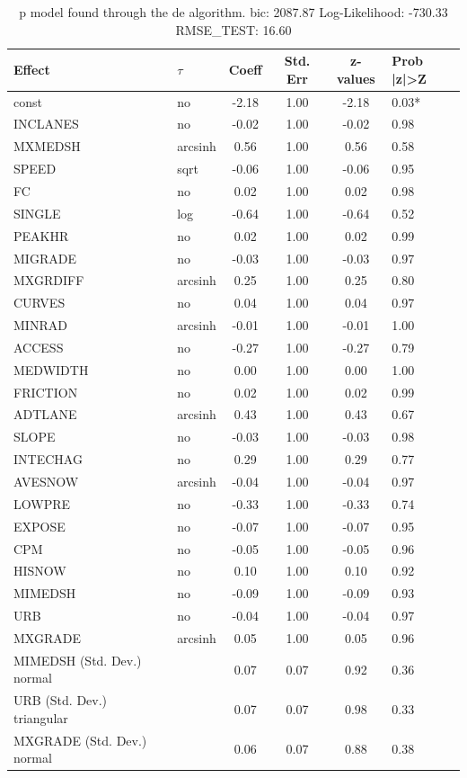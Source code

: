 \begin{table}
	\caption{p model found through the de algorithm. bic: 2087.87 Log-Likelihood: -730.33 RMSE_TEST: 16.60}
	\begin{center}
		\begin{tabular}{|l|l|c|c|c|l|}
			\hline
			Effect & $\tau$ & Coeff & Std. Err & z-values & Prob |z|>Z \\
			\hline
			const & no & -2.18 & 1.00 & -2.18 & 0.03* \\
			\hline
			INCLANES & no & -0.02 & 1.00 & -0.02 & 0.98 \\
			\hline
			MXMEDSH & arcsinh & 0.56 & 1.00 & 0.56 & 0.58 \\
			\hline
			SPEED & sqrt & -0.06 & 1.00 & -0.06 & 0.95 \\
			\hline
			FC & no & 0.02 & 1.00 & 0.02 & 0.98 \\
			\hline
			SINGLE & log & -0.64 & 1.00 & -0.64 & 0.52 \\
			\hline
			PEAKHR & no & 0.02 & 1.00 & 0.02 & 0.99 \\
			\hline
			MIGRADE & no & -0.03 & 1.00 & -0.03 & 0.97 \\
			\hline
			MXGRDIFF & arcsinh & 0.25 & 1.00 & 0.25 & 0.80 \\
			\hline
			CURVES & no & 0.04 & 1.00 & 0.04 & 0.97 \\
			\hline
			MINRAD & arcsinh & -0.01 & 1.00 & -0.01 & 1.00 \\
			\hline
			ACCESS & no & -0.27 & 1.00 & -0.27 & 0.79 \\
			\hline
			MEDWIDTH & no & 0.00 & 1.00 & 0.00 & 1.00 \\
			\hline
			FRICTION & no & 0.02 & 1.00 & 0.02 & 0.99 \\
			\hline
			ADTLANE & arcsinh & 0.43 & 1.00 & 0.43 & 0.67 \\
			\hline
			SLOPE & no & -0.03 & 1.00 & -0.03 & 0.98 \\
			\hline
			INTECHAG & no & 0.29 & 1.00 & 0.29 & 0.77 \\
			\hline
			AVESNOW & arcsinh & -0.04 & 1.00 & -0.04 & 0.97 \\
			\hline
			LOWPRE & no & -0.33 & 1.00 & -0.33 & 0.74 \\
			\hline
			EXPOSE & no & -0.07 & 1.00 & -0.07 & 0.95 \\
			\hline
			CPM & no & -0.05 & 1.00 & -0.05 & 0.96 \\
			\hline
			HISNOW & no & 0.10 & 1.00 & 0.10 & 0.92 \\
			\hline
			MIMEDSH & no & -0.09 & 1.00 & -0.09 & 0.93 \\
			\hline
			URB & no & -0.04 & 1.00 & -0.04 & 0.97 \\
			\hline
			MXGRADE & arcsinh & 0.05 & 1.00 & 0.05 & 0.96 \\
			\hline
			MIMEDSH (Std. Dev.) normal &  & 0.07 & 0.07 & 0.92 & 0.36 \\
			\hline
			URB (Std. Dev.) triangular &  & 0.07 & 0.07 & 0.98 & 0.33 \\
			\hline
			MXGRADE (Std. Dev.) normal &  & 0.06 & 0.07 & 0.88 & 0.38 \\
			\hline
		\end{tabular}
	\end{center}
\end{table}
